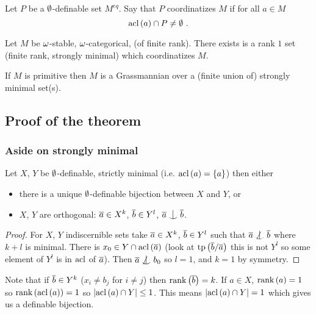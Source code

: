 \documentclass{amsart}
\begin{document}
Let $P$ be a $\emptyset$-definable set $M^{eq}$. Say that $P$ coordinatizes $M$ if for all
$a\in M$
\begin{equation}
\acl\left(a\right)\cap P\neq \emp \ .
\end{equation}

\begin{thm}
Let $M$ be $\omega$-stable, $\omega$-categorical, (of finite rank). There exists is a rank $1$ 
set (finite rank, strongly minimal) which coordinatizes $M$.
\end{thm}

\begin{cor}
If $M$ is primitive then $M$ is a Grassmannian over a (finite union of) strongly minimal
set(s).
\end{cor}

\subsection{Proof of the theorem}

\subsubsection{Aside on strongly minimal}

Let $X$, $Y$ be $\emptyset$-definable, strictly minimal (i.e. $\operatorname{acl}\left(a\right) =
\left\{a\right\}$)
then either
\begin{itemize}
\item there is a unique $\emptyset$-definable bijection between $X$ and $Y$, or
\item $X$, $Y$ are orthogonal: $\overline{a} \in X^k$, $\overline{b}\in Y^l$, $\oline{a}\indfrom
\oline{b}$.
\end{itemize}

\begin{proof}
For $X$, $Y$ indiscernible sets take $\overline{a}\in X^k$, $\overline{b}\in Y^l$ such that
$\oline{a}\not\indfrom \oline{b}$ where $k+l$ is minimal.
There is $x_0\in Y\cap \operatorname{acl}\left(\overline{a}\right)$ (look at
$\operatorname{tp}\left(\overline{b}/\overline{a}\right)$ this is not $Y^l$ so some element of $Y^l$ is in
$\operatorname{acl}$ of $\overline{a}$). Then $\oline{a}\not\indfrom b_0$ so $l = 1$, and $k = 1$ by
symmetry. 
\end{proof}

Note that if $\overline{b}\in Y^k$ ($x_i\neq b_j$ for $i\neq j$) then
$\operatorname{rank}\left(\overline{b}\right) = k$. 
If $a\in X$, $\operatorname{rank}\left(a\right) = 1$ so 
$\operatorname{rank}\left(\operatorname{acl}\left(a\right)\right) = 1$
so $\left| \operatorname{acl}\left(a\right)\cap Y \right|\leq 1$.
This means $\left| \operatorname{acl}\left(a\right)\cap Y \right| = 1$ which gives us a definable bijection.
\end{document}
